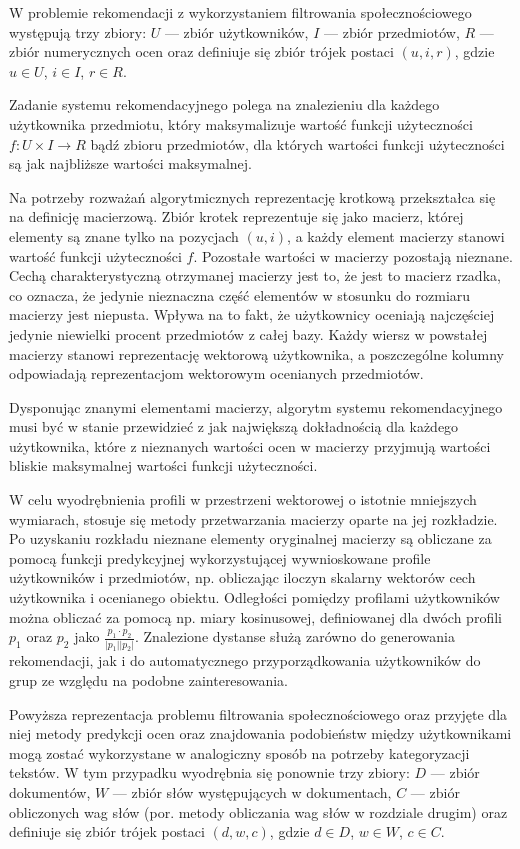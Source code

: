 \documentclass{pracamgr}
\newcommand{\abs}[1]{\lvert#1\rvert}
\begin{document}
W problemie rekomendacji z wykorzystaniem filtrowania społecznościowego występują trzy zbiory: $U$ --- zbiór użytkowników, $I$ --- zbiór przedmiotów, $R$ --- zbiór numerycznych ocen oraz definiuje się zbiór trójek postaci $(u, i, r)$, gdzie $u \in U$, $i \in I$, $r \in R$.

Zadanie systemu rekomendacyjnego polega na znalezieniu dla każdego użytkownika przedmiotu, który maksymalizuje wartość funkcji użyteczności $f : U \times I \rightarrow R$ bądź zbioru przedmiotów, dla których wartości funkcji użyteczności są jak najbliższe wartości maksymalnej.

Na potrzeby rozważań algorytmicznych reprezentację krotkową przekształca się na definicję macierzową. Zbiór krotek reprezentuje się jako macierz, której elementy są znane tylko na pozycjach $(u, i)$, a każdy element macierzy stanowi wartość funkcji użyteczności $f$. Pozostałe wartości w macierzy pozostają nieznane. Cechą charakterystyczną otrzymanej macierzy jest to, że jest to macierz rzadka, co oznacza, że jedynie nieznaczna część elementów w stosunku do rozmiaru macierzy jest niepusta. Wpływa na to fakt, że użytkownicy oceniają najczęściej jedynie niewielki procent przedmiotów z całej bazy. Każdy wiersz w powstałej macierzy stanowi reprezentację wektorową użytkownika, a poszczególne kolumny odpowiadają reprezentacjom wektorowym ocenianych przedmiotów.

Dysponując znanymi elementami macierzy, algorytm systemu rekomendacyjnego musi być w stanie przewidzieć z jak największą dokładnością dla każdego użytkownika, które z nieznanych wartości ocen w macierzy przyjmują wartości bliskie maksymalnej wartości funkcji użyteczności. 

W celu wyodrębnienia profili w przestrzeni wektorowej o istotnie mniejszych wymiarach, stosuje się metody przetwarzania macierzy oparte na jej rozkładzie. Po uzyskaniu rozkładu nieznane elementy oryginalnej macierzy są obliczane za pomocą funkcji predykcyjnej wykorzystującej wywnioskowane profile użytkowników i przedmiotów, np. obliczając iloczyn skalarny wektorów cech użytkownika i ocenianego obiektu. Odległości pomiędzy profilami użytkowników można obliczać za pomocą np. miary kosinusowej, definiowanej dla dwóch profili $p_1$ oraz $p_2$ jako $\frac{p_1 \cdot p_2}{\abs{p_1} \abs{p_2}}$. Znalezione dystanse służą zarówno do generowania rekomendacji, jak i do automatycznego przyporządkowania użytkowników do grup ze względu na podobne zainteresowania.

Powyższa reprezentacja problemu filtrowania społecznościowego oraz przyjęte dla niej metody predykcji ocen oraz znajdowania podobieństw między użytkownikami mogą zostać wykorzystane w analogiczny sposób na potrzeby kategoryzacji tekstów. W tym przypadku wyodrębnia się ponownie trzy zbiory: $D$ --- zbiór dokumentów, $W$ --- zbiór słów występujących w dokumentach, $C$ --- zbiór obliczonych wag słów (por. metody obliczania wag słów w rozdziale drugim) oraz definiuje się zbiór trójek postaci $(d, w, c)$, gdzie $d \in D$, $w \in W$, $c \in C$.
\end{document}
